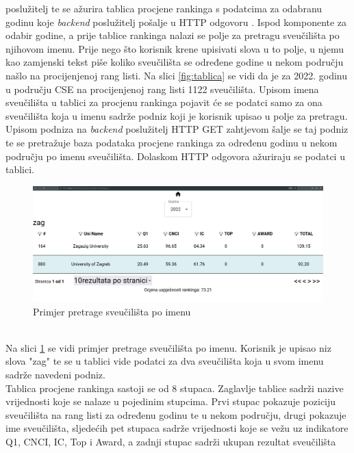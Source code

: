 \documentclass[times, utf8, zavrsni]{fer}
\begin{document}
poslužitelj te se ažurira tablica procjene rankinga s podatcima za odabranu godinu koje \emph{backend} poslužitelj pošalje u HTTP odgovoru .
\newpage Ispod komponente za odabir godine, a prije tablice rankinga
nalazi se polje za pretragu sveučilišta po njihovom imenu. Prije nego što korisnik krene upisivati slova u to polje, u njemu kao zamjenski tekst 
piše koliko sveučilišta se određene godine u nekom području našlo na procijenjenoj rang listi. Na slici \ref{fig:tablica} se vidi da je za 2022. godinu u području CSE 
na procijenjenoj rang listi 1122 sveučilišta.
Upisom imena sveučilišta u tablici za procjenu rankinga pojavit će se podatci samo za ona sveučilišta
koja u imenu sadrže podniz koji je korisnik upisao u polje za pretragu. Upisom podniza na \emph{backend} poslužitelj HTTP GET zahtjevom šalje se taj podniz te se 
pretražuje baza podataka procjene rankinga za određenu godinu u nekom području po imenu sveučilišta. Dolaskom HTTP odgovora ažuriraju se podatci u tablici.\\
\begin{figure}[htb]
    \hspace*{-2cm}  
       \includegraphics[scale=0.21]{search.png} 
       \caption{Primjer pretrage sveučilišta po imenu}
       \label{fig:search}
       \end{figure}
\\Na slici \ref{fig:search} se vidi primjer pretrage sveučilišta po imenu. Korisnik je upisao niz slova "zag" te se u tablici vide podatci za dva sveučilišta
koja u svom imenu sadrže navedeni podniz. 
\\Tablica procjene rankinga sastoji se od 8 stupaca. Zaglavlje tablice sadrži nazive vrijednosti koje se nalaze u pojedinim stupcima.
Prvi stupac pokazuje poziciju sveučilišta na rang listi za određenu godinu te u nekom području, drugi 
pokazuje ime sveučilišta, sljedećih pet stupaca sadrže vrijednosti koje se vežu uz indikatore Q1, CNCI, IC, Top i Award, a zadnji stupac sadrži ukupan rezultat sveučilišta 
\end{document}
